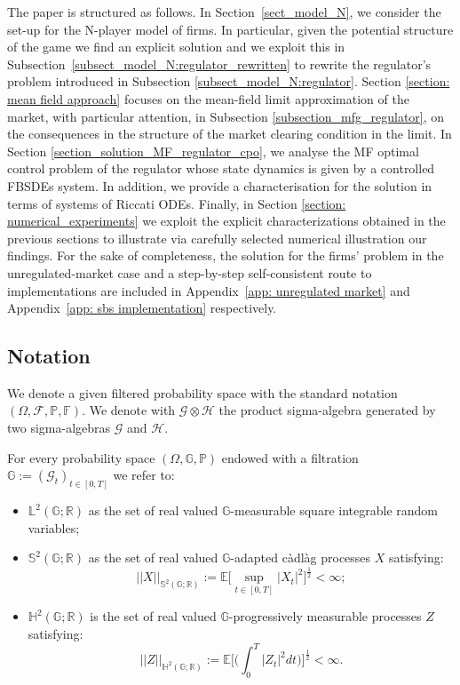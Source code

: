 \documentclass[11pt,twoside]{amsart}
\theoremstyle{definition}
\numberwithin{equation}{section}
\newcommand{\E}{\mathbb{E}}
\newcommand{\G}{\mathbb{G}}
\newcommand{\R}{\mathbb{R}}
\newcommand{\prob}{\mathbb{P}}
\newcommand{\setup}{(\Omega,\mathcal{F},\mathbb{P},\mathbb{F})}
\newcommand{\cadlag}{c\`{a}dl\`{a}g }
\begin{document}
The paper is structured as follows. In Section~\ref{sect_model_N}, we consider the set-up for the N-player model of firms. In particular, given the potential structure of the game we find an explicit solution and we exploit this in Subsection~\ref{subsect_model_N:regulator_rewritten} to rewrite the regulator's problem introduced in Subsection \ref{subsect_model_N:regulator}. Section \ref{section: mean field approach} focuses on the mean-field limit approximation of the market, with particular attention, in Subsection \ref{subsection_mfg_regulator}, on the consequences in the structure of the market clearing condition in the limit.
In Section \ref{section_solution_MF_regulator_cpo}, we analyse the MF optimal control problem of the regulator whose state dynamics is given by a controlled FBSDEs system. In addition, we provide a characterisation for the solution in terms of  systems of Riccati ODEs. Finally, in Section \ref{section: numerical_experiments}
we exploit the explicit characterizations obtained in the previous sections to illustrate via carefully selected numerical illustration our findings. 
For the sake of completeness, the solution for the firms' problem in the unregulated-market case and a step-by-step self-consistent route to implementations are included in Appendix~\ref{app: unregulated market} and Appendix~\ref{app: sbs implementation} respectively.

\subsection*{Notation}
We denote a given filtered probability space with the standard notation $\setup$. We denote with $\mathcal{G}\otimes\mathcal{H}$ the product sigma-algebra generated by two sigma-algebras $\mathcal{G}$ and $\mathcal{H}$. 

For every probability space $(\Omega,\mathbb{G},\prob)$ endowed with a filtration $\mathbb{G}:= (\mathcal{G}_t)_{t\in[0,T]}$ we refer to:
\begin{itemize}
\item $\mathbb{L}^2(\G;\R)$ as the set of real valued $\G$-measurable square integrable random variables;
\item $\mathbb{S}^2(\mathbb{G};\R)$ as the set of real valued $\mathbb{G}$-adapted \cadlag  processes $X$ satisfying:
\begin{displaymath}
||X||_{\mathbb{S}^2(\mathbb{G};\R)}:= \E\bigg[ \sup_{t\in[0,T]} |X_t|^2 \bigg]^{\frac{1}{2}}<\infty;
\end{displaymath}
\item $\mathbb{H}^2(\mathbb{G};\R)$ is the set of real valued $\mathbb{G}$-progressively measurable processes $Z$ satisfying:
\begin{displaymath}
||Z||_{\mathbb{H}^2(\mathbb{G};\R)} := \E\bigg[ \bigg( \int_0^T |Z_t|^2 dt \bigg) \bigg]^{\frac{1}{2}}<\infty.
\end{displaymath}
\end{itemize}
\end{document}
